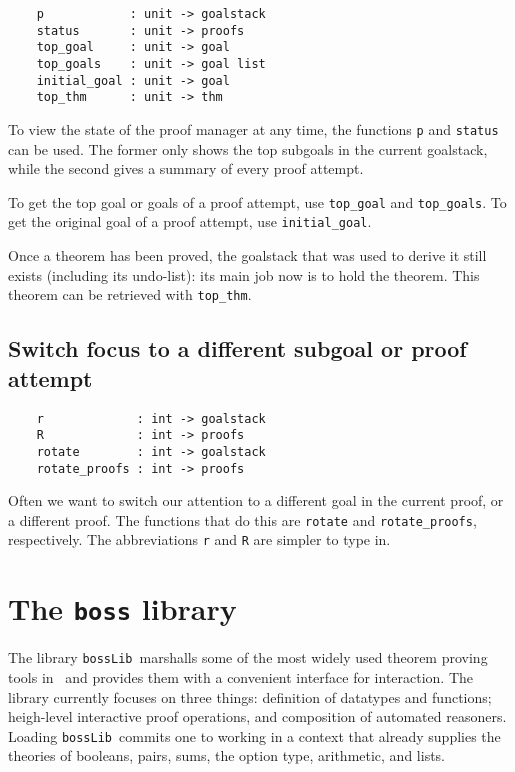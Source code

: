 \begin{verbatim}
    p            : unit -> goalstack
    status       : unit -> proofs
    top_goal     : unit -> goal
    top_goals    : unit -> goal list
    initial_goal : unit -> goal
    top_thm      : unit -> thm
\end{verbatim}

To view the state of the proof manager at any time, the functions
\verb+p+ and \verb+status+ can be used. The former only shows
the top subgoals in the current goalstack, while the second gives a
summary of every proof attempt.

To get the top goal or goals of a proof attempt, use \verb+top_goal+
and \verb+top_goals+. To get the original goal of a proof attempt,
use \verb+initial_goal+.

Once a theorem has been proved, the goalstack that was used to derive it
still exists (including its undo-list): its main job now is to
hold the theorem. This theorem can be retrieved with
\verb+top_thm+.

\subsection{Switch focus to a different subgoal or proof attempt}

\begin{verbatim}
    r             : int -> goalstack
    R             : int -> proofs
    rotate        : int -> goalstack
    rotate_proofs : int -> proofs
\end{verbatim}

Often we want to switch our attention to a different goal in the current
proof, or a different proof. The functions that do this are
\verb+rotate+ and \verb+rotate_proofs+, respectively. The abbreviations
\verb+r+ and \verb+R+ are simpler to type in.
\section{The {\tt boss} library}
\newcommand\bossLib{{\tt bossLib}}

The library \bossLib\ marshalls some of the most widely used
theorem proving tools in \HOL\ and provides them with a convenient
interface for interaction. The library currently focuses on three things:
definition of datatypes and functions; heigh-level interactive proof
operations, and composition of automated
reasoners. Loading \bossLib\ commits one to working in a context
that already supplies the theories of booleans, pairs, sums, the option type,
arithmetic, and lists.

